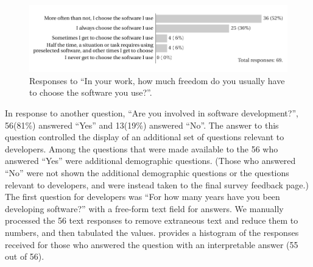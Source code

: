 \documentclass{casicswhitepaper}
\newcommand{\totalDevelopers}{56\xspace}
\newcommand{\totalNotDevelopers}{13\xspace}
\begin{document}
\begin{figure}[htb]
  \vspace*{1ex}
  \centering
  \includegraphics{files/plots/how-often-choose-software.pdf}
  \vspace*{-3.5ex}
  \caption{Responses to ``In your work, how much freedom do you usually have to choose the software you use?''.}
  \label{freedom}
\end{figure}

In response to another question, ``Are you involved in software development?'', \totalDevelopers (81\%) answered ``Yes'' and \totalNotDevelopers (19\%) answered ``No''.  The answer to this question controlled the display of an additional set of questions relevant to developers.  Among the questions that were made available to the \totalDevelopers who answered ``Yes'' were additional demographic questions.  (Those who answered ``No'' were not shown the additional demographic questions or the questions relevant to developers, and were instead taken to the final survey feedback page.)  The first question for developers was ``For how many years have you been developing software?'' with a free-form text field for answers.  We manually processed the \totalDevelopers text responses to remove extraneous text and reduce them to numbers, and then tabulated the values.   provides a histogram of the responses received for those who answered the question with an interpretable answer (55 out of \totalDevelopers).

\end{document}
